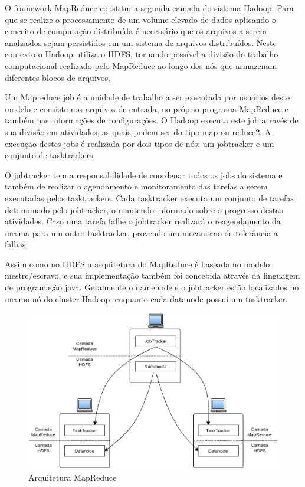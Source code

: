 O framework MapReduce constitui a segunda camada do sistema Hadoop. Para que se realize o processamento de um volume elevado de dados aplicando o conceito de computação distribuída é necessário que os arquivos a serem analisados sejam persistidos em um sistema de arquivos distribuídos. Neste contexto o Hadoop utiliza o HDFS, tornando possível a divisão do trabalho computacional realizado pelo MapReduce ao longo dos nós que armazenam diferentes blocos de arquivos.

Um Mapreduce job é a unidade de trabalho a ser executada por usuários deste modelo e consiste nos arquivos de entrada, no próprio programa MapReduce e também nas informações de configurações. O Hadoop executa este job através de sua divisão em atividades, as quais podem ser do tipo map ou reduce2. A execução destes jobs é realizada por dois tipos de nós: um jobtracker e um conjunto de tasktrackers. 

O jobtracker tem a responsabilidade de coordenar todos os jobs do sistema e também de realizar o agendamento e monitoramento das tarefas a serem executadas pelos tasktrackers. Cada tasktracker executa um conjunto de tarefas determinado pelo jobtracker, o mantendo informado sobre o progresso destas atividades. Caso uma tarefa falhe o jobtracker realizará o reagendamento da mesma para um outro tasktracker, provendo um mecanismo de tolerância a falhas.

Assim como no HDFS a arquitetura do MapReduce é baseada no modelo mestre/escravo, e sua implementação também foi concebida através da linguagem de programação java. Geralmente o namenode e o jobtracker estão localizados no mesmo nó do cluster Hadoop, enquanto cada datanode possui um tasktracker.

\begin{figure}[h!]
	\centering
	\includegraphics[keepaspectratio=true,scale=0.35]
	  {figuras/mapreduce-arquitetura.eps}
	\caption{Arquitetura MapReduce}
	\label{fig-mapreduce-arquitetura}
\end{figure}


